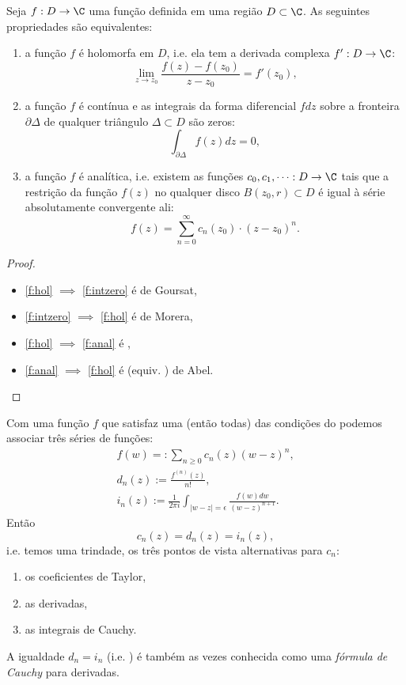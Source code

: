 \begin{teorema}
\label{t:criterio}
Seja $f: D \to \C$ uma função definida em uma região $D\subset \C$. 
As seguintes propriedades são equivalentes:
\begin{enumerate}
\item \label{f:hol}
a função $f$ é holomorfa em $D$, i.e. ela tem a derivada complexa $f' : D \to \C$:
\[ \lim_{z\to z_0} \frac{f(z)-f(z_0)}{z-z_0} = f'(z_0), \]
\item \label{f:intzero}
a função $f$ é contínua e as integrais da forma diferencial $f dz$
sobre a fronteira $\partial \Delta$
de qualquer triângulo $\Delta \subset D$ são zeros: 
\[ \int_{\partial \Delta} f(z) dz = 0 , \]
\item \label{f:anal}
a função $f$ é analítica, i.e. existem as funções $c_0,c_1,\dots: D\to\C$ tais que
a restrição da função $f(z)$ no qualquer disco $B(z_0,r) \subset D$
é igual à série absolutamente convergente ali:
\[ f(z) = \sum_{n=0}^\infty c_n(z_0) \cdot (z-z_0)^n. \]
\end{enumerate}
\end{teorema}
\begin{proof}
\begin{itemize}
\item \eqref{f:hol} $\implies$ \eqref{f:intzero} é  de Goursat,
\item \eqref{f:intzero} $\implies$ \eqref{f:hol} é  de Morera,
\item \eqref{f:hol} $\implies$ \eqref{f:anal} é ,
\item \eqref{f:anal} $\implies$ \eqref{f:hol} é 
(equiv. ) de Abel.
\end{itemize}
\end{proof}

\begin{remark}
Com uma função $f$ que satisfaz uma (então todas) das condições do 
podemos associar três séries de funções:
\begin{align*}
f(w) =: \sum_{n\geq 0} c_n(z) (w-z)^n,\\
d_n(z) := \frac{f^{(n)}(z)}{n!},\\
i_n(z) := \frac{1}{2\pi i} \int_{|w-z|=\epsilon} \frac{f(w)dw}{(w-z)^{n+1}}.
\end{align*}
Então
\[ c_n(z) = d_n(z) = i_n(z), \]
i.e. temos uma trindade, os três pontos de vista alternativas para $c_n$:
\begin{enumerate}
\item os coeficientes de Taylor,
\item as derivadas,
\item as integrais de Cauchy.
\end{enumerate}
A igualdade $d_n = i_n$ (i.e. )
é também as vezes conhecida como uma \emph{fórmula de Cauchy} para derivadas.
\end{remark}

